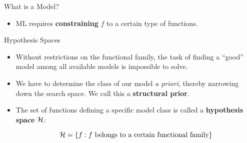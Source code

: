 \documentclass[11pt,compress,t,notes=noshow, xcolor=table]{beamer}
\begin{document}
\begin{vbframe}{What is a Model?}
\begin{itemize}
  \vspace{0.2cm}
  
  \item ML requires \textbf{constraining} $f$ to a   certain type of functions.

\end{itemize}

\end{vbframe}


\begin{vbframe}{Hypothesis Spaces}

\begin{itemize}

  \item Without restrictions on the functional family, the task of finding a 
  \enquote{good} model among all available models is impossible to solve.
  
  \item We have to determine the class of our model \emph{a priori}, 
  thereby narrowing down the search space. We  call this a 
  \textbf{structural prior}.
  
  \item The set of functions defining a specific model class is called a 
  \textbf{hypothesis space} $\mathcal{H}$:
  
  $$\mathcal{H} = \{f: f \text{ belongs to a certain functional family}\}$$
  

\end{itemize}  

\end{vbframe}

\end{document}
